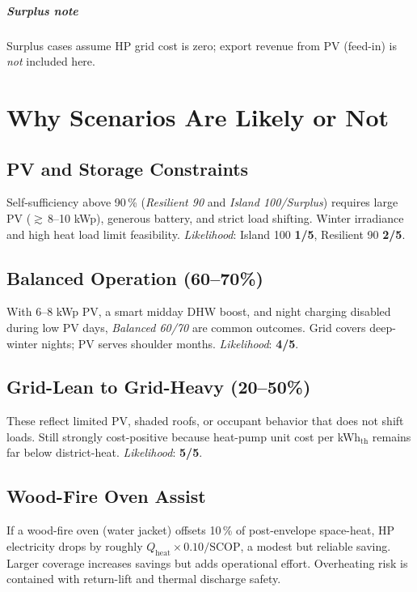 \documentclass[12pt,oneside]{report}
\begin{document}
\paragraph{Surplus note} Surplus cases assume HP grid cost is zero; export revenue from PV (feed-in) is \emph{not} included here.

\chapter{Why Scenarios Are Likely or Not}
\section{PV and Storage Constraints}
Self-sufficiency above \num{90}\,\% (\emph{Resilient 90} and \emph{Island 100/Surplus}) requires large PV (\(\gtrsim\)\,8–10 kWp), generous battery, and strict load shifting. Winter irradiance and high heat load limit feasibility. \emph{Likelihood}: Island 100 \textbf{1/5}, Resilient 90 \textbf{2/5}.

\section{Balanced Operation (60–70\%)}
With 6–8 kWp PV, a smart midday DHW boost, and night charging disabled during low PV days, \emph{Balanced 60/70} are common outcomes. Grid covers deep-winter nights; PV serves shoulder months. \emph{Likelihood}: \textbf{4/5}.

\section{Grid-Lean to Grid-Heavy (20–50\%)}
These reflect limited PV, shaded roofs, or occupant behavior that does not shift loads. Still strongly cost-positive because heat-pump unit cost per kWh$_\mathrm{th}$ remains far below district-heat. \emph{Likelihood}: \textbf{5/5}.

\section{Wood-Fire Oven Assist}
If a wood-fire oven (water jacket) offsets \num{10}\,\% of post-envelope space-heat, HP electricity drops by roughly \(Q_\mathrm{heat}\times 0.10/\mathrm{SCOP}\), a modest but reliable saving. Larger coverage increases savings but adds operational effort. Overheating risk is contained with return-lift and thermal discharge safety.
\end{document}
